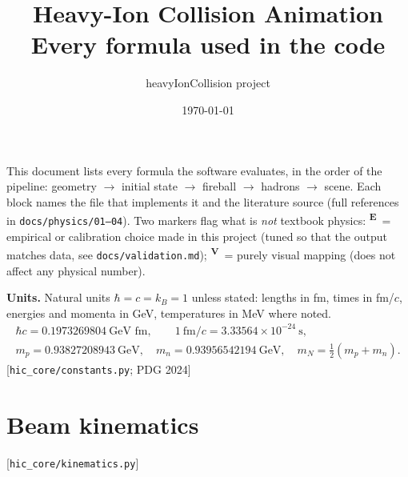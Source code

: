 \documentclass[11pt,a4paper]{article}
\title{Heavy-Ion Collision Animation\\[2pt]\large Every formula used in the code}
\author{heavyIonCollision project}
\date{\today}
\newcommand{\file}[1]{\texttt{\small #1}}
\newcommand{\src}[1]{\hfill{\small\color{gray}[#1]}}
\newcommand{\emp}{\textsuperscript{\color{orange!80!black}\textbf{E}}}
\newcommand{\vis}{\textsuperscript{\color{blue!70!black}\textbf{V}}}
\begin{document}
\maketitle

\noindent This document lists every formula the software evaluates, in the order of the pipeline:
geometry $\to$ initial state $\to$ fireball $\to$ hadrons $\to$ scene. Each block names the file that implements it
and the literature source (full references in \file{docs/physics/01--04}).
Two markers flag what is \emph{not} textbook physics:
\emp~= empirical or calibration choice made in this project (tuned so that the output matches data, see
\file{docs/validation.md});
\vis~= purely visual mapping (does not affect any physical number).

\textbf{Units.} Natural units $\hbar=c=k_B=1$ unless stated: lengths in fm, times in fm/$c$, energies and momenta in GeV,
temperatures in MeV where noted.
\begin{gather*}
\hbar c = 0.1973269804~\text{GeV fm},\qquad 1~\text{fm}/c = 3.33564\times10^{-24}~\text{s},\\
m_p = 0.93827208943~\text{GeV},\quad m_n = 0.93956542194~\text{GeV},\quad m_N = \tfrac12(m_p+m_n).
\end{gather*}
\src{\file{hic\_core/constants.py}; PDG 2024}

\tableofcontents
\newpage

\section{Beam kinematics}\label{sec:kin}
\src{\file{hic\_core/kinematics.py}}
\end{document}
